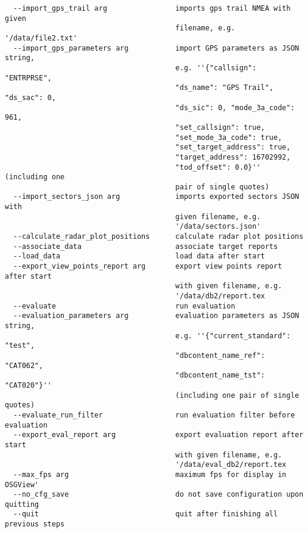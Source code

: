 \begin{lstlisting}
  --import_gps_trail arg                imports gps trail NMEA with given 
                                        filename, e.g. '/data/file2.txt'
  --import_gps_parameters arg           import GPS parameters as JSON string, 
                                        e.g. ''{"callsign": "ENTRPRSE", 
                                        "ds_name": "GPS Trail", "ds_sac": 0, 
                                        "ds_sic": 0, "mode_3a_code": 961, 
                                        "set_callsign": true, 
                                        "set_mode_3a_code": true, 
                                        "set_target_address": true, 
                                        "target_address": 16702992, 
                                        "tod_offset": 0.0}'' (including one 
                                        pair of single quotes)
  --import_sectors_json arg             imports exported sectors JSON with 
                                        given filename, e.g. 
                                        '/data/sectors.json'
  --calculate_radar_plot_positions      calculate radar plot positions
  --associate_data                      associate target reports
  --load_data                           load data after start
  --export_view_points_report arg       export view points report after start 
                                        with given filename, e.g. 
                                        '/data/db2/report.tex
  --evaluate                            run evaluation
  --evaluation_parameters arg           evaluation parameters as JSON string, 
                                        e.g. ''{"current_standard": "test", 
                                        "dbcontent_name_ref": "CAT062", 
                                        "dbcontent_name_tst": "CAT020"}'' 
                                        (including one pair of single quotes)
  --evaluate_run_filter                 run evaluation filter before evaluation
  --export_eval_report arg              export evaluation report after start 
                                        with given filename, e.g. 
                                        '/data/eval_db2/report.tex
  --max_fps arg                         maximum fps for display in OSGView'
  --no_cfg_save                         do not save configuration upon quitting
  --quit                                quit after finishing all previous steps

\end{lstlisting}
\ \\


